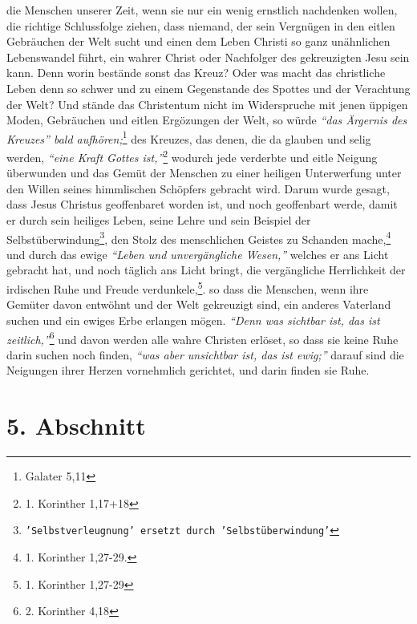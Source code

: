 die Menschen unserer Zeit, wenn sie nur ein wenig ernstlich nachdenken wollen,
die richtige Schlussfolge ziehen, dass niemand, der sein Vergnügen in den eitlen
Gebräuchen der Welt sucht und einen dem Leben Christi so ganz unähnlichen
Lebenswandel führt, ein wahrer Christ oder Nachfolger des gekreuzigten Jesu sein
kann. Denn worin bestände sonst das Kreuz? Oder was macht das christliche
Leben denn so schwer und zu einem Gegenstande des Spottes und der Verachtung der
Welt? Und stände das Christentum nicht im Widerspruche mit jenen üppigen Moden,
Gebräuchen und eitlen Ergözungen der Welt, so würde
\textit{"`das Ärgernis des Kreuzes"' bald aufhören;}\footnote{Galater 5,11}
des Kreuzes, das denen, die da glauben und
selig werden,
\textit{"`eine Kraft Gottes ist,"'}\footnote{1. Korinther 1,17+18}
wodurch jede
verderbte und eitle Neigung überwunden und das Gemüt der Menschen zu einer
heiligen Unterwerfung unter den Willen seines himmlischen Schöpfers gebracht
wird. Darum wurde gesagt, dass Jesus Christus geoffenbaret worden ist, und noch
geoffenbart werde, damit er durch sein heiliges Leben, seine Lehre und sein
Beispiel der Selbstüberwindung\footnote{\texttt{'Selbstverleugnung' ersetzt
durch 'Selbstüberwindung'}}, den Stolz des menschlichen Geistes zu Schanden
mache,\footnote{1. Korinther 1,27-29.}
und durch das ewige \textit{"`Leben und unvergängliche
Wesen,"'} welches er ans Licht gebracht hat, und noch täglich ans
Licht bringt,
die vergängliche Herrlichkeit der irdischen Ruhe und Freude
verdunkele,\footnote{1. Korinther 1,27-29}.
so dass die Menschen, wenn ihre
Gemüter davon entwöhnt und der Welt gekreuzigt sind, ein anderes Vaterland
suchen und ein ewiges Erbe erlangen mögen.
\textit{"`Denn was sichtbar ist, das ist zeitlich,"'}\footnote{2. Korinther
4,18}
und davon werden alle wahre Christen erlöset,
so dass sie keine Ruhe darin suchen noch finden,
\textit{"`was aber unsichtbar ist, das
ist ewig;"'} darauf sind die Neigungen ihrer Herzen vornehmlich gerichtet, und
darin finden sie Ruhe.

\section{5. Abschnitt} \label{kap16_ab5}

